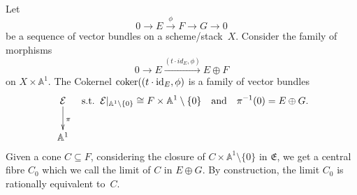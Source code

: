 \documentclass[pdftex]{sigma}
\numberwithin{equation}{section}
\newcommand{\E}{\mathfrak E}
\theoremstyle{plain}
\theoremstyle{definition}
\theoremstyle{remark}
\begin{document}
\begin{construction}\label{defvb}
Let
\[
0\rightarrow E\xrightarrow{\phi} F\rightarrow G\rightarrow 0
\]
be a sequence of vector bundles on a scheme/stack~$X$. Consider the family of morphisms
\[
0\rightarrow E\xrightarrow{(t\cdot id_E,\phi)} E\oplus F
\]
on $X\times\mathbb A^1$. The Cokernel $\operatorname{coker}((t\cdot {\rm id}_E,\phi)$ is a family of vector bundles
\begin{align*}
\xymatrix{\mathcal{E}\ar[d]^{\pi}\\
\mathbb{A}^1}\;\;\;\text{s.t.}\;\;\mathcal{E}\rvert_{\mathbb{A}^1\setminus\{0\}}\cong F\times \mathbb{A}^1\setminus\{0\}\quad
\text{and}\quad \pi^{-1}(0)=E\oplus G.
\end{align*}
Given a cone $C\subseteq F$, considering the closure of $C\times \mathbb{A}^1\setminus \{0 \}$ in $\E$, we get a central fibre $C_0$ which we call the limit of $C$ in $E\oplus G$. By construction, the limit $C_0$ is rationally equivalent to~$C$.
\end{construction}
\end{document}
